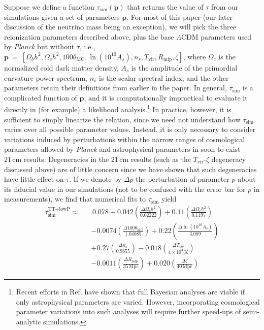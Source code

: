 \documentclass[twocolumn,aps,prd,nofootinbib,showpacs,superscriptaddress]{revtex4-1}
\begin{document}
Suppose we define a function $\tau_\textrm{sim} (\mathbf{p})$ that returns the value of $\tau$ from our simulations given a set of parameters $\mathbf{p}$. For most of this paper (our later discussion of the neutrino mass being an exception), we will pick the three reionization parameters described above, plus the base $\Lambda$CDM parameters used by \emph{Planck} but without $\tau$, i.e., $\mathbf{p}~=~\left[ \Omega_b h^2, \Omega_c h^2, 100\theta_\textrm{MC}, \ln ( 10^{10} A_s), n_s, T_\textrm{vir}, R_\textrm{mfp}, \zeta \right]$, where $\Omega_c$ is the normalized cold dark matter density, $A_s$ is the amplitude of the primordial curvature power spectrum, $n_s$ is the scalar spectral index, and the other parameters retain their definitions from earlier in the paper. In general, $\tau_\textrm{sim}$ is a complicated function of $\mathbf{p}$, and it is computationally impractical to evaluate it directly in (for example) a likelihood analysis.\footnote{Recent efforts in Ref. \cite{greig_and_mesinger2015} have shown that full Bayesian analyses are viable if only astrophysical parameters are varied. However, incorporating cosmological parameter variations into such analyses will require further speed-ups of semi-analytic simulations.}  In practice, however, it is sufficient to simply linearize the relation, since we need not understand how $\tau_\textrm{sim}$ varies over all possible parameter values. Instead, it is only necessary to consider variations induced by perturbations within the narrow ranges of cosmological parameters allowed by \emph{Planck} and astrophysical parameters in soon-to-exist $21\,\textrm{cm}$ results. Degeneracies in the $21\,\textrm{cm}$ results (such as the $T_\textrm{vir}$-$\zeta$ degeneracy discussed above) are of little concern since we have shown that such degeneracies have little effect on $\tau$. If we denote by $\Delta p$ the perturbation of parameter $p$ about its fiducial value in our simulations (not to be confused with the error bar for $p$ in measurements), we find that numerical fits to $\tau_\textrm{sim}$ yield
\begin{eqnarray}
\label{eq:TTlowP_linearTau}
\tau_\textrm{sim}^\textrm{TT+lowP} \approx &&\, 0.078 + 0.042 \left(\frac{\Delta\Omega_b h^2}{0.02222}\right) +  0.11\left(\frac{\Delta\Omega_c h^2}{0.1197}\right) \nonumber\\
&& -0.0074 \left(\frac{\Delta100\theta_\textrm{MC}}{1.04085}\right)  + 0.22  \left(\frac{\Delta\ln (10^{10} A_s)}{3.089}\right)\nonumber \\
&& + 0.27 \left(\frac{\Delta n_s}{0.9655}\right) -0.018\left(\frac{\Delta T_\textrm{vir}}{4 \times 10^4\,\textrm{K}}\right)\nonumber \\
&& -0.0011 \left(\frac{\Delta R_\textrm{mfp}}{35\,\textrm{Mpc}}\right) + 0.020 \left(\frac{\Delta \zeta}{40\,\textrm{Mpc}}\right)
\end{eqnarray}
\end{document}

